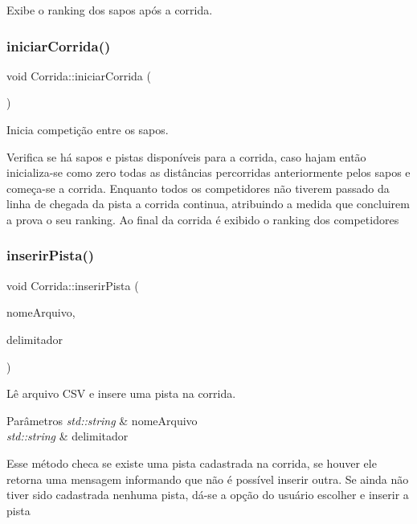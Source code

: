 Exibe o ranking dos sapos após a corrida. 

\mbox{\label{classCorrida_a814cb193a7e47d7693543ce870cf192e}} 
\subsubsection{\texorpdfstring{iniciar\+Corrida()}{iniciarCorrida()}}
{\footnotesize\ttfamily void Corrida\+::iniciar\+Corrida (\begin{DoxyParamCaption}{ }\end{DoxyParamCaption})}



Inicia competição entre os sapos. 

Verifica se há sapos e pistas disponíveis para a corrida, caso hajam então inicializa-\/se como zero todas as distâncias percorridas anteriormente pelos sapos e começa-\/se a corrida. Enquanto todos os competidores não tiverem passado da linha de chegada da pista a corrida continua, atribuindo a medida que concluirem a prova o seu ranking. Ao final da corrida é exibido o ranking dos competidores \mbox{\label{classCorrida_a3a135667906e66adbe1a38ecdae0c048}} 
\subsubsection{\texorpdfstring{inserir\+Pista()}{inserirPista()}}
{\footnotesize\ttfamily void Corrida\+::inserir\+Pista (\begin{DoxyParamCaption}\item[{std\+::string}]{nome\+Arquivo,  }\item[{std\+::string}]{delimitador }\end{DoxyParamCaption})}



Lê arquivo C\+SV e insere uma pista na corrida. 


\begin{DoxyParams}{Parâmetros}
{\em std\+::string} & nome\+Arquivo \\
\hline
{\em std\+::string} & delimitador\\
\hline
\end{DoxyParams}
Esse método checa se existe uma pista cadastrada na corrida, se houver ele retorna uma mensagem informando que não é possível inserir outra. Se ainda não tiver sido cadastrada nenhuma pista, dá-\/se a opção do usuário escolher e inserir a pista \mbox{\label{classCorrida_aee79fcba9ecca389b2e31f517490fc73}} 
